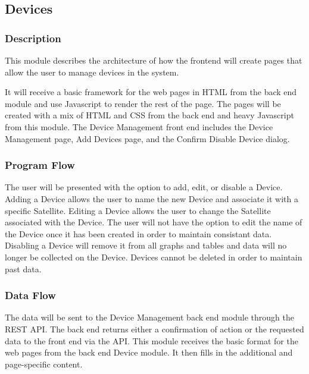 
\subsection{Devices}

\subsubsection{Description}

This module describes the architecture of how the frontend will create pages that allow the user to manage devices in the system. 

It will receive a basic framework for the web pages in \ac{HTML} from the back end module and use Javascript to render the rest of the page. 
The pages will be created with a mix of \ac{HTML} and \ac{CSS} from the back end and heavy Javascript from this module. 
The Device Management front end includes the Device Management page, Add Devices page, and the Confirm Disable Device dialog. 

\subsubsection{Program Flow}

The user will be presented with the option to add, edit, or disable a Device. 
Adding a Device allows the user to name the new Device and associate it with a specific Satellite. 
Editing a Device allows the user to change the Satellite associated with the Device. 
The user will not have the option to edit the name of the Device once it has been created in order to maintain consistant data. 
Disabling a Device will remove it from all graphs and tables and data will no longer be collected on the Device.
Devices cannot be deleted in order to maintain past data.

\subsubsection{Data Flow}

The data will be sent to the Device Management back end module through the \ac{REST} \ac{API}. 
The back end returns either a confirmation of action or the requested data to the front end via the \ac{API}. 
This module receives the basic format for the web pages from the back end Device module. 
It then fills in the additional and page-specific content. 


